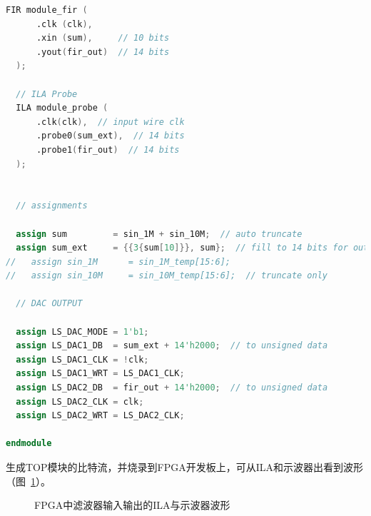 \documentclass[lang=cn,newtx,10pt,scheme=chinese]{elegantbook}
\begin{document}
\begin{lstlisting}[language=verilog,caption={顶层模块}]
  FIR module_fir (
      .clk (clk),
      .xin (sum),     // 10 bits
      .yout(fir_out)  // 14 bits
  );

  // ILA Probe
  ILA module_probe (
      .clk(clk),  // input wire clk
      .probe0(sum_ext),  // 14 bits 
      .probe1(fir_out)  // 14 bits
  );


  // assignments

  assign sum         = sin_1M + sin_10M;  // auto truncate
  assign sum_ext     = {{3{sum[10]}}, sum};  // fill to 14 bits for output
//   assign sin_1M      = sin_1M_temp[15:6];
//   assign sin_10M     = sin_10M_temp[15:6];  // truncate only

  // DAC OUTPUT

  assign LS_DAC_MODE = 1'b1;
  assign LS_DAC1_DB  = sum_ext + 14'h2000;  // to unsigned data
  assign LS_DAC1_CLK = !clk;
  assign LS_DAC1_WRT = LS_DAC1_CLK;
  assign LS_DAC2_DB  = fir_out + 14'h2000;  // to unsigned data
  assign LS_DAC2_CLK = clk;
  assign LS_DAC2_WRT = LS_DAC2_CLK;

endmodule

\end{lstlisting}

生成TOP模块的比特流，并烧录到FPGA开发板上，可从ILA和示波器出看到波形（图~\ref{fig:exp4:Implementation}）。
\begin{figure}[htbp]
  \centering
  \newline
  \caption{FPGA中滤波器输入输出的ILA与示波器波形}
  \label{fig:exp4:Implementation}
\end{figure}
\end{document}
